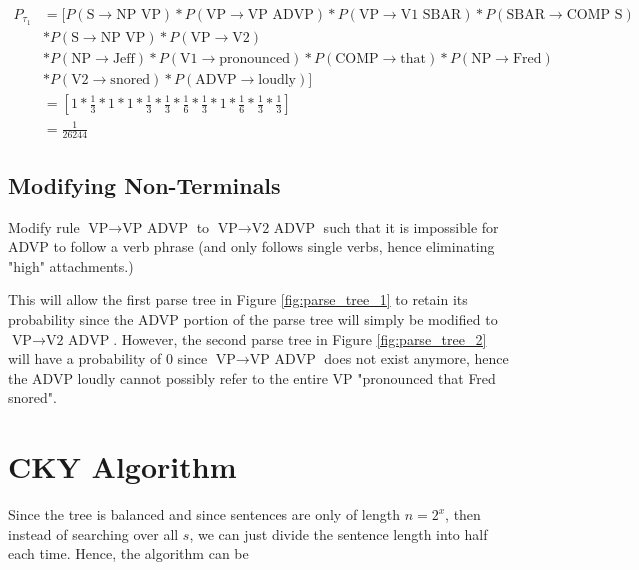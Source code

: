 \documentclass[11pt]{scrartcl}
\newcommand{\n}[1]{\ensuremath{\text{#1}}}
\begin{document}
\begin{align*}
P_{\tau_1} &= [ P(\n{S} \rightarrow \n{NP VP}) * P(\n{VP} \rightarrow \n{VP ADVP}) * P(\n{VP} \rightarrow \n{V1 SBAR}) * P(\n{SBAR} \rightarrow \n{COMP S}) \\
&* P(\n{S} \rightarrow \n{NP VP}) * P(\n{VP} \rightarrow \n{V2}) \\ 
&* P(\n{NP} \rightarrow \n{Jeff}) * P(\n{V1} \rightarrow \n{pronounced}) * P(\n{COMP} \rightarrow \n{that}) * P(\n{NP} \rightarrow \n{Fred}) \\
&* P(\n{V2} \rightarrow \n{snored}) * P(\n{ADVP} \rightarrow \n{loudly}) ] \\
&= \left[ 1 * \frac{1}{3} * 1 * 1 *\frac{1}{3} * \frac{1}{3} * \frac{1}{6} * \frac{1}{3} * 1 * \frac{1}{6} * \frac{1}{3} * \frac{1}{3} \right] \\
&= \frac{1}{26244}
\end{align*}

\subsection{Modifying Non-Terminals}

Modify rule $\n{VP} \rightarrow \n{VP ADVP}$ to $\n{VP} \rightarrow \n{V2 ADVP}$ such that it is impossible for ADVP to follow a verb phrase (and only follows single verbs, hence eliminating "high" attachments.)

This will allow the first parse tree in Figure \ref{fig:parse_tree_1} to retain its probability since the ADVP portion of the parse tree will simply be modified to $\n{VP} \rightarrow \n{V2 ADVP}$. However, the second parse tree in Figure \ref{fig:parse_tree_2} will have a probability of 0 since $\n{VP} \rightarrow \n{VP ADVP}$ does not exist anymore, hence the ADVP loudly cannot possibly refer to the entire VP "pronounced that Fred snored".

\section{CKY Algorithm}

Since the tree is balanced and since sentences are only of length $n=2^x$, then instead of searching over all $s$, we can just divide the sentence length into half each time. Hence, the algorithm can be
\end{document}
